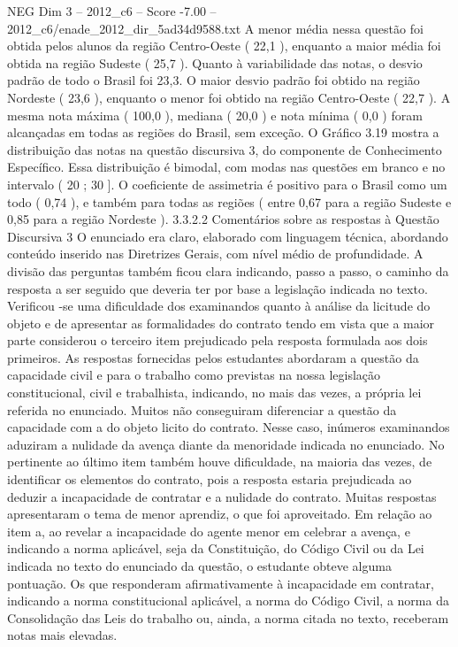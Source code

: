 \begin{textsample}{NEG Dim 3 – 2012\_c6 – Score -7.00 – 2012\_c6/enade\_2012\_dir\_5ad34d9588.txt}
A menor média nessa questão foi obtida pelos alunos da região Centro-Oeste ( 22,1 ), enquanto a maior média foi obtida na região Sudeste ( 25,7 ).
Quanto à variabilidade das notas, o desvio padrão de todo o Brasil foi 23,3.
O maior desvio padrão foi obtido na região Nordeste ( 23,6 ), enquanto o menor foi obtido na região Centro-Oeste ( 22,7 ).
A mesma nota máxima ( 100,0 ), mediana ( 20,0 ) e nota mínima ( 0,0 ) foram alcançadas em todas as regiões do Brasil, sem exceção.
O Gráfico 3.19 mostra a distribuição das notas na questão discursiva 3, do componente de Conhecimento Específico.
Essa distribuição é bimodal, com modas nas questões em branco e no intervalo ( 20 ; 30 ].
O coeficiente de assimetria é positivo para o Brasil como um todo ( 0,74 ), e também para todas as regiões ( entre 0,67 para a região Sudeste e 0,85 para a região Nordeste ). 3.3.2.2 Comentários sobre as respostas à Questão Discursiva 3 O enunciado era claro, elaborado com linguagem técnica, abordando conteúdo inserido nas Diretrizes Gerais, com nível médio de profundidade.
A divisão das perguntas também ficou clara indicando, passo a passo, o caminho da resposta a ser seguido que deveria ter por base a legislação indicada no texto.
Verificou -se uma dificuldade dos examinandos quanto à análise da licitude do objeto e de apresentar as formalidades do contrato tendo em vista que a maior parte considerou o terceiro item prejudicado pela resposta formulada aos dois primeiros.
As respostas fornecidas pelos estudantes abordaram a questão da capacidade civil e para o trabalho como previstas na nossa legislação constitucional, civil e trabalhista, indicando, no mais das vezes, a própria lei referida no enunciado.
Muitos não conseguiram diferenciar a questão da capacidade com a do objeto licito do contrato.
Nesse caso, inúmeros examinandos aduziram a nulidade da avença diante da menoridade indicada no enunciado.
No pertinente ao último item também houve dificuldade, na maioria das vezes, de identificar os elementos do contrato, pois a resposta estaria prejudicada ao deduzir a incapacidade de contratar e a nulidade do contrato.
Muitas respostas apresentaram o tema de menor aprendiz, o que foi aproveitado.
Em relação ao item a, ao revelar a incapacidade do agente menor em celebrar a avença, e indicando a norma aplicável, seja da Constituição, do Código Civil ou da Lei indicada no texto do enunciado da questão, o estudante obteve alguma pontuação.
Os que responderam afirmativamente à incapacidade em contratar, indicando a norma constitucional aplicável, a norma do Código Civil, a norma da Consolidação das Leis do trabalho ou, ainda, a norma citada no texto, receberam notas mais elevadas.

\end{textsample}

